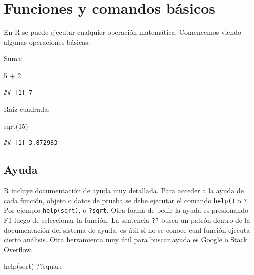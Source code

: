 \documentclass[
]{book}
\newenvironment{Shaded}{\begin{snugshade}}{\end{snugshade}}
\newcommand{\DecValTok}[1]{\textcolor[rgb]{0.00,0.00,0.81}{#1}}
\newcommand{\FunctionTok}[1]{\textcolor[rgb]{0.00,0.00,0.00}{#1}}
\newcommand{\NormalTok}[1]{#1}
\newcommand{\SpecialCharTok}[1]{\textcolor[rgb]{0.00,0.00,0.00}{#1}}
\begin{document}
\hypertarget{funciones-y-comandos-buxe1sicos}{%
\chapter{Funciones y comandos básicos}\label{funciones-y-comandos-buxe1sicos}}

En R se puede ejecutar cualquier operación matemática. Comencemos viendo algunas operaciones básicas:

Suma:

\begin{Shaded}
\begin{Highlighting}[]
\DecValTok{5} \SpecialCharTok{+} \DecValTok{2}
\end{Highlighting}
\end{Shaded}

\begin{verbatim}
## [1] 7
\end{verbatim}

Raíz cuadrada:

\begin{Shaded}
\begin{Highlighting}[]
\FunctionTok{sqrt}\NormalTok{(}\DecValTok{15}\NormalTok{)}
\end{Highlighting}
\end{Shaded}

\begin{verbatim}
## [1] 3.872983
\end{verbatim}

\hypertarget{ayuda-1}{%
\section{Ayuda}\label{ayuda-1}}

R incluye documentación de ayuda muy detallada. Para acceder a la ayuda de cada función, objeto o datos de prueba se debe ejecutar el comando \texttt{help()} o \texttt{?}. Por ejemplo \texttt{help(sqrt)}, o \texttt{?sqrt}. Otra forma de pedir la ayuda es presionando F1 luego de seleccionar la función. La sentencia \texttt{??} busca un patrón dentro de la documentación del sistema de ayuda, es útil si no se conoce cual función ejecuta cierto análisis. Otra herramienta muy útil para buscar ayuda es Google o \href{https://stackoverflow.com/}{Stack Overflow}.

\begin{Shaded}
\begin{Highlighting}[]
\FunctionTok{help}\NormalTok{(sqrt)}
\NormalTok{??square}
\end{Highlighting}
\end{Shaded}
\end{document}
